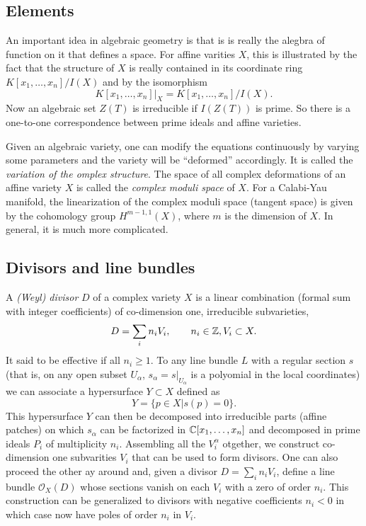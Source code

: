     \subsection{Elements}

        An important idea in algebraic geometry is that is is really the alegbra of function on it that defines a space. For affine varities $X$, this is illustrated by the fact that the structure of $X$ is really contained in its coordinate ring $K[x_1,\dots,x_n]/I(X)$ and by the isomorphism
        \begin{equation}
            K[x_1,\dots,x_n]|_X=K[x_1,\dots,x_n]/I(X).
        \end{equation}
        Now an algebraic set $Z(T)$ is irreducible if $I(Z(T))$ is prime. So there is a one-to-one correspondence between prime ideals and affine varieties.

        Given an algebraic variety, one can modify the equations continuously by varying some parameters and the variety will be ``deformed'' accordingly. It is called the \emph{variation of the omplex structure}. The space of all complex deformations of an affine variety $X$ is called the \emph{complex moduli space} of $X$. For a Calabi-Yau manifold, the linearization of the complex moduli space (tangent space) is given by the cohomology group $H^{m-1,1}(X)$, where $m$ is the dimension of $X$. In general, it is much more complicated.

    \subsection{Divisors and line bundles}

        A \emph{(Weyl) divisor} $D$ of a complex variety $X$ is a linear combination (formal sum with integer coefficients) of co-dimension one, irreducible subvarieties,
        \begin{equation}
            D=\sum_i n_iV_i,\qquad n_i\in\mathbb{Z},V_i\subset X.
        \end{equation}
        It said to be effective if all $n_i\geq1$. To any line bundle $L$ with a regular section $s$ (that is, on any open subset $U_\alpha$, $s_\alpha=s|_{U_\alpha}$ is a polyomial in the local coordinates) we can associate a hypersurface $Y\subset X$ defined as
        \begin{equation}
            Y=\{p\in X|s(p)=0\}.
        \end{equation}
        This hypersurface $Y$ can then be decomposed into irreducible parts (affine patches) on which $s_\alpha$ can be factorized in $\mathbb{C}[x_1,\dots,x_n]$ and decomposed in prime ideals $P_i$ of multiplicity $n_i$. Assembling all the $V^\alpha_i$ otgether, we construct co-dimension one subvarities $V_i$ that can be used to form divisors. One can also proceed the other ay around and, given a divisor $D=\sum_i n_iV_i$, define a line bundle $\mathcal{O}_X(D)$ whose sections vanish on each $V_i$ with a zero of order $n_i$. This construction can be generalized to divisors with negative coefficients $n_i<0$ in which case now have poles of order $n_i$ in $V_i$.

